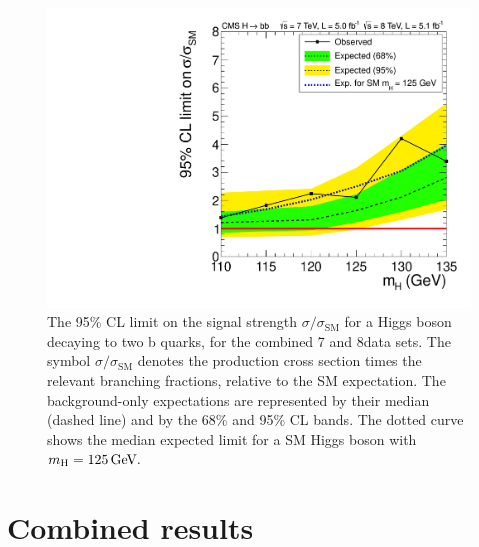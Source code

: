 \documentclass[11pt,twoside,a4paper,cmspaper,final]{cms-tdr}
\begin{document}
\begin{figure}[htbp]
  \begin{center}
    \includegraphics[width=\cmsFigWideWidth]{sqr_acls_hbb_nominal_inject2_ylin}
    \caption{The 95\% CL limit on the signal strength $\sigma/\sigma_\mathrm{SM}$ for a Higgs boson
      decaying to two b quarks, for the combined 7 and 8\TeV data sets.
The symbol $\sigma/\sigma_\mathrm{SM}$ denotes the production cross section times the relevant branching fractions,
relative to the SM expectation.
The background-only expectations are represented by their median
(dashed line) and by the 68\%  and 95\% CL bands. The dotted curve shows the median expected limit for a SM Higgs boson with $m_{\mathrm{H}} = 125\,\text{Ge\hspace{-.08em}V}.$
}
    \label{fig:HbbLimit}
  \end{center}
\end{figure}




\section{Combined results}\label{sec:Results}
\end{document}
